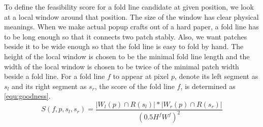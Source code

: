 
To define the feasibility score for a fold line candidate at given position, we look at a local window around that position. The size of the window has clear physical meanings. When we make actual popup crafts out of a hard paper, a fold line has to be long enough so that it connects two patch stably. Also, we want patches beside it to be wide enough so that the fold line is easy to fold by hand. The height of the local window is chosen to be the minimal fold line length and the width of the local window is chosen to be twice of the minimal patch width beside a fold line. For a fold line $f$ to appear at pixel $p$, denote its left segment as $s_l$ and its right segment as $s_r$, the score of the fold line $f$, is determined as \ref{equ:goodness}.
\begin{equation}
  S(f, p, s_l, s_r) = \frac{|W_l(p) \cap R(s_l)| * |W_r(p) \cap R(s_r)|}{(0.5 H^f W^f)^2}
  \label{equ:goodness}
\end{equation}

